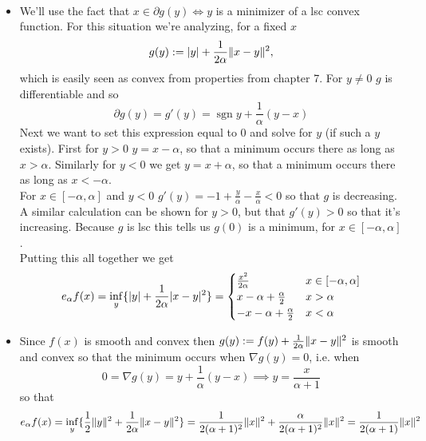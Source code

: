 \documentclass{article}
\newenvironment{ex}[1]
  {\renewcommand\theexercise{#1}\exercise}
  {\endexercise}
\DeclareMathOperator*{\sgn}{sgn}
\begin{document}
\begin{ex}{11.11} %
  \, \\
  \begin{itemize}
    \item
      We'll use the fact that $x \in \partial g(y) \iff y$ is a minimizer of a lsc convex function. For this situation we're analyzing, for a fixed $x$
      $$
      g(y) := \lvert y\rvert + \frac{1}{2\alpha} \lVert x - y\rVert^2,
      $$
      which is easily seen as convex from properties from chapter 7. For $y \ne 0$ $g$ is differentiable and so
      $$
      \partial g(y) = g'(y) = \sgn y + \frac{1}{\alpha} (y - x)
      $$
      Next we want to set this expression equal to $0$ and solve for $y$ (if such a $y$ exists). First for $y > 0$ $y = x - \alpha$, so that a minimum occurs there as long as $x > \alpha$. Similarly for $y < 0$ we get $y = x + \alpha$, so that a minimum occurs there as long as $x < -\alpha$. \, \\

      For $x \in [-\alpha, \alpha]$ and $y < 0$ $g'(y) = -1 + \frac{y}{\alpha} - \frac{x}{\alpha} < 0$ so that $g$ is decreasing. A similar calculation can be shown for $y > 0$, but that $g'(y) > 0$ so that it's increasing. Because $g$ is lsc this tells us $g(0)$ is a minimum, for $x \in [-\alpha, \alpha]$. \, \\

      Putting this all together we get
      $$
      e_\alpha f(x) = \inf_y \{ \lvert y\rvert + \frac{1}{2\alpha} \lvert x - y\rvert^2 \} = \begin{cases}
        \frac{x^2}{2\alpha} & x \in [-\alpha, \alpha] \\
        x - \alpha + \frac{\alpha}{2} & x > \alpha \\
        - x - \alpha + \frac{\alpha}{2} & x < \alpha
      \end{cases}
      $$
    \item
      Since $f(x)$ is smooth and convex then $g(y) := f(y) + \frac{1}{2\alpha} \lVert x-y\rVert^2$ is smooth and convex so that the minimum occurs when $\nabla g (y) = 0$, i.e. when
      $$
      0 = \nabla g(y) = y + \frac{1}{\alpha} (y - x) \implies y = \frac{x}{\alpha + 1}
      $$
      so that
      $$
      e_\alpha f(x) = \inf_y \{ \frac{1}{2}\lVert y\rVert^2 + \frac{1}{2\alpha} \lVert x - y\rVert^2 \} = \frac{1}{2(\alpha + 1)^2}\lVert x\rVert^2 + \frac{\alpha}{2(\alpha+1)^2} \lVert x\rVert^2 = \frac{1}{2(\alpha + 1)} \lVert x\rVert^2
      $$
  \end{itemize}
\end{ex} %
\end{document}
